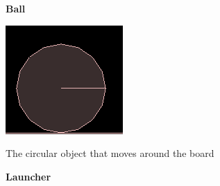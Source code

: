 \documentclass{article}
\begin{document}
    \textbf{Ball}

    \begin{minipage}[t]{0.25\textwidth}
        \vspace{0pt}
        \centering
        \includegraphics[width=0.9\linewidth,natwidth=610,natheight=642]{ball.png} 
        \label{fig:ball}
    \end{minipage}
    \begin{minipage}[t]{0.6\textwidth}
        \vspace{0pt}
        The circular object that moves around the board
    \end{minipage}
    
    \textbf{Launcher}
\end{document}
